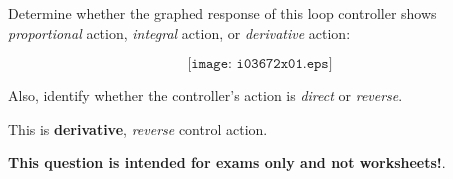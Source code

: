 

Determine whether the graphed response of this loop controller shows {\it proportional} action, {\it integral} action, or {\it derivative} action:

$$\texttt{[image: i03672x01.eps]}$$

Also, identify whether the controller's action is {\it direct} or {\it reverse}.







This is {\bf derivative}, {\it reverse} control action.







{\bf This question is intended for exams only and not worksheets!}.


